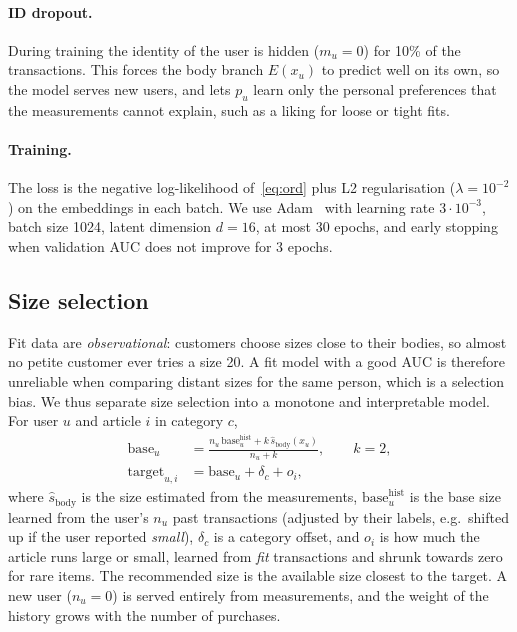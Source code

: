 \paragraph{ID dropout.} During training the identity of the user is hidden ($m_u = 0$) for 10\% of the transactions. This forces the body branch $E(x_u)$ to predict well on its own, so the model serves new users, and lets $p_u$ learn only the personal preferences that the measurements cannot explain, such as a liking for loose or tight fits.

\paragraph{Training.} The loss is the negative log-likelihood of~\eqref{eq:ord} plus L2 regularisation ($\lambda = 10^{-2}$) on the embeddings in each batch. We use Adam~\cite{kingma2015adam} with learning rate $3\cdot10^{-3}$, batch size 1024, latent dimension $d=16$, at most 30 epochs, and early stopping when validation AUC does not improve for 3 epochs.

\subsection{Size selection}
Fit data are \emph{observational}: customers choose sizes close to their bodies, so almost no petite customer ever tries a size 20. A fit model with a good AUC is therefore unreliable when comparing distant sizes for the same person, which is a selection bias. We thus separate size selection into a monotone and interpretable model. For user $u$ and article $i$ in category $c$,
\begin{align}
\mathrm{base}_u &= \frac{n_u\,\mathrm{base}^{\mathrm{hist}}_u + k\,\hat s_{\mathrm{body}}(x_u)}{n_u + k}, \qquad k = 2,\\
\mathrm{target}_{u,i} &= \mathrm{base}_u + \delta_c + o_i,
\end{align}
where $\hat s_{\mathrm{body}}$ is the size estimated from the measurements, $\mathrm{base}^{\mathrm{hist}}_u$ is the base size learned from the user's $n_u$ past transactions (adjusted by their labels, e.g.\ shifted up if the user reported \emph{small}), $\delta_c$ is a category offset, and $o_i$ is how much the article runs large or small, learned from \emph{fit} transactions and shrunk towards zero for rare items. The recommended size is the available size closest to the target. A new user ($n_u = 0$) is served entirely from measurements, and the weight of the history grows with the number of purchases.

